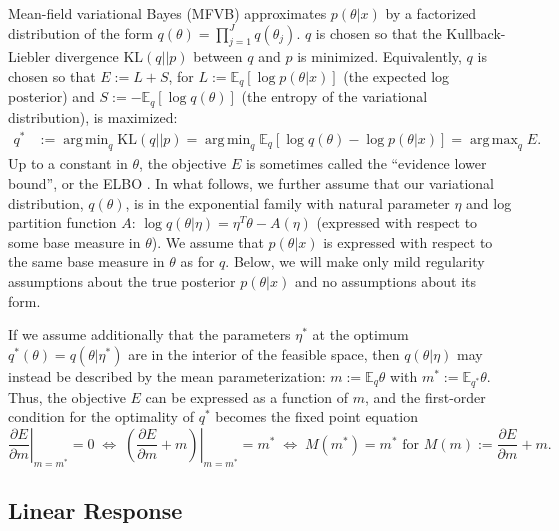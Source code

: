 \documentclass{article}\usepackage[]{graphicx}\usepackage[]{color}
\newcommand{\npq}{\eta} %
\newcommand{\mpq}{m} %
\newcommand{\mpopt}{m^*} %
\newcommand{\npopt}{\eta^*} %
\newcommand{\klshort}{E}
\newcommand{\kl}{\textrm{KL}}
\DeclareMathOperator*{\argmin}{arg\,min}
\DeclareMathOperator*{\argmax}{arg\,max}
\newcommand{\mbe}{\mathbb{E}}
\begin{document}
Mean-field variational Bayes (MFVB) approximates $p(\theta | x)$ by a factorized
distribution of the form $q(\theta) = \prod_{j=1}^{J} q(\theta_j)$. $q$ is
chosen so that the Kullback-Liebler divergence $\kl(q || p)$ between $q$ and $p$
is minimized. Equivalently, $q$ is chosen so that $\klshort := L + S$, for $L :=
\mbe_q[\log p (\theta | x)]$ (the expected log posterior) and $S := -
\mbe_q[\log q(\theta)]$ (the entropy of the variational distribution),
%
is maximized:
\begin{align} \label{eq:kl}
  q^{*} &:= \argmin_{q} \kl(q || p) = \argmin_{q} \mbe_{q} \left[ \log q(\theta) - \log p(\theta | x)  \right] = \argmax_{q} E.
\end{align}
%
Up to a constant in $\theta$, the objective $\klshort$ is sometimes called the
``evidence lower bound'', or the ELBO \citep{bishop:2006:pattern}. In what
follows, we further assume that our variational distribution,
$q\left(\theta\right)$, is in the exponential family with natural parameter
$\npq$ and log partition function $A$:
%
$
\log q\left(\theta \vert \npq \right) =
  \npq^{T}\theta - A\left(\npq\right)
$
%
(expressed with respect to some base measure in $\theta$). We assume that
$p\left(\theta \vert x\right)$ is expressed with respect to the same base
measure in $\theta$ as for $q$. Below, we will make only mild regularity
assumptions about the true posterior $p(\theta | x)$ and no assumptions about
its form.

If we assume additionally that the parameters $\npopt$ at the optimum
$q^*(\theta) = q(\theta | \npopt)$ are in the interior of the feasible space,
then $q(\theta | \npq)$ may instead be described by the mean parameterization:
$\mpq := \mbe_{q} \theta$ with $\mpopt := \mbe_{q^*} \theta$. Thus, the
objective $\klshort$ can be expressed as a function of $m$, and the first-order
condition for the optimality of $q^*$ becomes the fixed point equation
%
\begin{equation}
  \label{eq:fixed_pt}
  \left. \frac{\partial \klshort}{\partial \mpq} \right|_{\mpq = \mpopt} = 0
  \;
  \Leftrightarrow
  \;
  \left. \left( \frac{\partial \klshort}{\partial \mpq} + \mpq \right) \right|_{\mpq = \mpopt} = \mpopt
  \;
  \Leftrightarrow
  \;
  M(\mpopt) = \mpopt
  \textrm{ for } M(\mpq) := \frac{\partial \klshort}{\partial \mpq} + \mpq.
\end{equation}

\subsection{Linear Response}\label{sec:lr_subsection}
\end{document}
